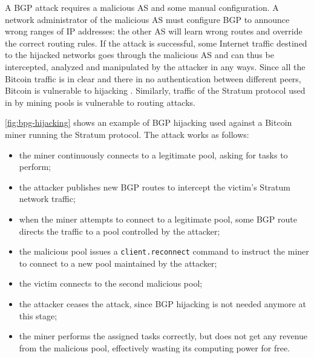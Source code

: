 A \ac{BGP} attack requires a malicious \ac{AS} and some manual configuration.
A network administrator of the malicious \ac{AS} must configure \ac{BGP} to announce wrong ranges of IP addresses:
the other \ac{AS} will learn wrong routes and override the correct routing rules.
If the attack is successful, some Internet traffic destined to the hijacked networks goes through the malicious \ac{AS} and can thus be intercepted, analyzed and manipulated by the attacker in any ways.
Since all the Bitcoin traffic is in clear and there in no authentication between different peers, Bitcoin is vulnerable to hijacking \cite{hijacking_bitcoin_2017}.
Similarly, traffic of the Stratum protocol used in by mining pools is vulnerable to routing attacks.

\bigskip
\cref{fig:bpg-hijacking} shows an example of \ac{BGP} hijacking used against a Bitcoin miner running the Stratum protocol.
The attack works as follows:
\begin{itemize}
	\item the miner continuously connects to a legitimate pool, asking for tasks to perform;
	\item the attacker publishes new \ac{BGP} routes to intercept the victim's Stratum network traffic;
	\item when the miner attempts to connect to a legitimate pool, some \ac{BGP} route directs the traffic to a pool controlled by the attacker;
	\item the malicious pool issues a \texttt{client.reconnect} \cite{stratum_manual} command to instruct the miner to connect to a new pool maintained by the attacker;
	\item the victim connects to the second malicious pool;
	\item the attacker ceases the attack, since \ac{BGP} hijacking is not needed anymore at this stage;
	\item the miner performs the assigned tasks correctly, but does not get any revenue from the malicious pool, effectively wasting its computing power for free.
\end{itemize}

